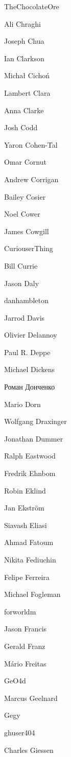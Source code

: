 \begin{DoxyItemize}
\item The\+Chocolate\+Ore
\item Ali Chraghi
\item Joseph Chua
\item Ian Clarkson
\item Michał Cichoń
\item Lambert Clara
\item Anna Clarke
\item Josh Codd
\item Yaron Cohen-\/\+Tal
\item Omar Cornut
\item Andrew Corrigan
\item Bailey Cosier
\item Noel Cower
\item James Cowgill
\item Curiouser\+Thing
\item Bill Currie
\item Jason Daly
\item danhambleton
\item Jarrod Davis
\item Olivier Delannoy
\item Paul R. Deppe
\item Michael Dickens
\item Роман Донченко
\item Mario Dorn
\item Wolfgang Draxinger
\item Jonathan Dummer
\item Ralph Eastwood
\item Fredrik Ehnbom
\item Robin Eklind
\item Jan Ekström
\item Siavash Eliasi
\item Ahmad Fatoum
\item Nikita Fediuchin
\item Felipe Ferreira
\item Michael Fogleman
\item forworldm
\item Jason Francis
\item Gerald Franz
\item Mário Freitas
\item Ge\+O4d
\item Marcus Geelnard
\item Gegy
\item ghuser404
\item Charles Giessen

\end{DoxyItemize}
